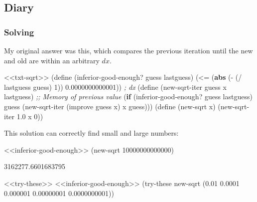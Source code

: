 \documentclass[
]{article}
\newenvironment{Shaded}{}{}
\newcommand{\CommentTok}[1]{\textcolor[rgb]{0.38,0.63,0.69}{\textit{#1}}}
\newcommand{\DecValTok}[1]{\textcolor[rgb]{0.25,0.63,0.44}{#1}}
\newcommand{\ExtensionTok}[1]{#1}
\newcommand{\FloatTok}[1]{\textcolor[rgb]{0.25,0.63,0.44}{#1}}
\newcommand{\FunctionTok}[1]{\textcolor[rgb]{0.02,0.16,0.49}{#1}}
\newcommand{\KeywordTok}[1]{\textcolor[rgb]{0.00,0.44,0.13}{\textbf{#1}}}
\newcommand{\NormalTok}[1]{#1}
\newcommand{\OperatorTok}[1]{\textcolor[rgb]{0.40,0.40,0.40}{#1}}
\begin{document}
\hypertarget{diary}{%
\subsection{Diary}\label{diary}}

\hypertarget{solving}{%
\subsubsection{Solving}\label{solving}}

My original answer was this, which compares the previous iteration until
the new and old are within an arbitrary \(dx\).

\hypertarget{inferior-good-enough}{%
\label{inferior-good-enough}}%
\begin{Shaded}
\begin{Highlighting}[numbers=left,,]
\NormalTok{\textless{}\textless{}txt{-}sqrt\textgreater{}\textgreater{}}
\NormalTok{(}\ExtensionTok{define}\FunctionTok{ }\NormalTok{(inferior{-}good{-}enough? guess lastguess)}
\NormalTok{  (}\OperatorTok{\textless{}=}
\NormalTok{   (}\KeywordTok{abs}\NormalTok{ (}\OperatorTok{{-}}
\NormalTok{         (}\OperatorTok{/}\NormalTok{ lastguess guess)}
         \DecValTok{1}\NormalTok{))}
   \FloatTok{0.0000000000001}\NormalTok{)) }\CommentTok{; dx}
\NormalTok{(}\ExtensionTok{define}\FunctionTok{ }\NormalTok{(new{-}sqrt{-}iter guess x lastguess) }\CommentTok{;; Memory of previous value}
\NormalTok{  (}\KeywordTok{if}\NormalTok{ (inferior{-}good{-}enough? guess lastguess)}
\NormalTok{      guess}
\NormalTok{      (new{-}sqrt{-}iter (improve guess x) x guess)))}
\NormalTok{(}\ExtensionTok{define}\FunctionTok{ }\NormalTok{(new{-}sqrt x)}
\NormalTok{  (new{-}sqrt{-}iter }\FloatTok{1.0}\NormalTok{ x }\DecValTok{0}\NormalTok{))}
\end{Highlighting}
\end{Shaded}

This solution can correctly find small and large numbers:

\begin{Shaded}
\begin{Highlighting}[numbers=left,,]
\NormalTok{\textless{}\textless{}inferior{-}good{-}enough\textgreater{}\textgreater{}}
\NormalTok{(new{-}sqrt }\DecValTok{10000000000000}\NormalTok{)}
\end{Highlighting}
\end{Shaded}

3162277.6601683795

\hypertarget{EX1-7-t2}{%
\label{EX1-7-t2}}%
\begin{Shaded}
\begin{Highlighting}[numbers=left,,]
\NormalTok{\textless{}\textless{}try{-}these\textgreater{}\textgreater{}}
\NormalTok{\textless{}\textless{}inferior{-}good{-}enough\textgreater{}\textgreater{}}
\NormalTok{(try{-}these new{-}sqrt \textquotesingle{}(}\FloatTok{0.01} \FloatTok{0.0001} \FloatTok{0.000001} \FloatTok{0.00000001} \FloatTok{0.0000000001}\NormalTok{))}
\end{Highlighting}
\end{Shaded}
\end{document}
